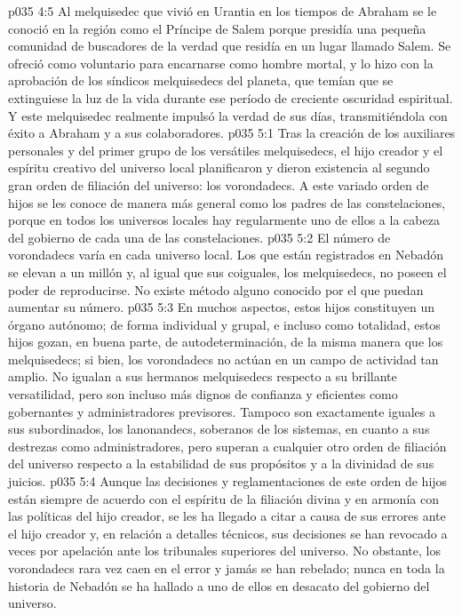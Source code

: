 \vs p035 4:5 \pc Al melquisedec que vivió en Urantia en los tiempos de Abraham se le conoció en la región como el Príncipe de Salem porque presidía una pequeña comunidad de buscadores de la verdad que residía en un lugar llamado Salem. Se ofreció como voluntario para encarnarse como hombre mortal, y lo hizo con la aprobación de los síndicos melquisedecs del planeta, que temían que se extinguiese la luz de la vida durante ese período de creciente oscuridad espiritual. Y este melquisedec realmente impulsó la verdad de sus días, transmitiéndola con éxito a Abraham y a sus colaboradores.
\vs p035 5:1 Tras la creación de los auxiliares personales y del primer grupo de los versátiles melquisedecs, el hijo creador y el espíritu creativo del universo local planificaron y dieron existencia al segundo gran orden de filiación del universo: los vorondadecs. A este variado orden de hijos se les conoce de manera más general como los padres de las constelaciones, porque en todos los universos locales hay regularmente uno de ellos a la cabeza del gobierno de cada una de las constelaciones.
\vs p035 5:2 \pc El número de vorondadecs varía en cada universo local. Los que están registrados en Nebadón se elevan a un millón y, al igual que sus coiguales, los melquisedecs, no poseen el poder de reproducirse. No existe método alguno conocido por el que puedan aumentar su número.
\vs p035 5:3 \pc En muchos aspectos, estos hijos constituyen un órgano autónomo; de forma individual y grupal, e incluso como totalidad, estos hijos gozan, en buena parte, de autodeterminación, de la misma manera que los melquisedecs; si bien, los vorondadecs no actúan en un campo de actividad tan amplio. No igualan a sus hermanos melquisedecs respecto a su brillante versatilidad, pero son incluso más dignos de confianza y eficientes como gobernantes y administradores previsores. Tampoco son exactamente iguales a sus subordinados, los lanonandecs, soberanos de los sistemas, en cuanto a sus destrezas como administradores, pero superan a cualquier otro orden de filiación del universo respecto a la estabilidad de sus propósitos y a la divinidad de sus juicios.
\vs p035 5:4 Aunque las decisiones y reglamentaciones de este orden de hijos están siempre de acuerdo con el espíritu de la filiación divina y en armonía con las políticas del hijo creador, se les ha llegado a citar a causa de sus errores ante el hijo creador y, en relación a detalles técnicos, sus decisiones se han revocado a veces por apelación ante los tribunales superiores del universo. No obstante, los vorondadecs rara vez caen en el error y jamás se han rebelado; nunca en toda la historia de Nebadón se ha hallado a uno de ellos en desacato del gobierno del universo.
